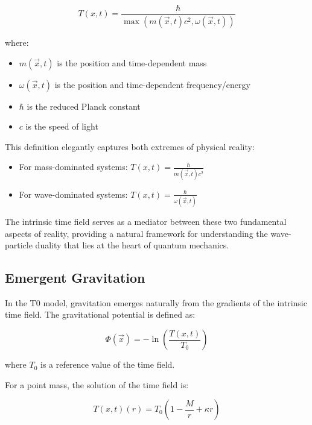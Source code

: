 \documentclass[12pt,a4paper]{article}
\newcommand{\Tfieldt}{T(x,t)}
\newcommand{\Tzero}{T_0}
\newcommand{\vecx}{\vec{x}}
\begin{document}
	\begin{equation}
		\Tfieldt = \frac{\hbar}{\max(m(\vecx,t)c^2, \omega(\vecx,t))}
		\label{eq:time_field}
	\end{equation}
	
	where:
	\begin{itemize}
		\item $m(\vecx,t)$ is the position and time-dependent mass
		\item $\omega(\vecx,t)$ is the position and time-dependent frequency/energy
		\item $\hbar$ is the reduced Planck constant
		\item $c$ is the speed of light
	\end{itemize}
	
	This definition elegantly captures both extremes of physical reality:
	\begin{itemize}
		\item For mass-dominated systems: $\Tfieldt = \frac{\hbar}{m(\vecx,t)c^2}$
		\item For wave-dominated systems: $\Tfieldt = \frac{\hbar}{\omega(\vecx,t)}$
	\end{itemize}
	
	The intrinsic time field serves as a mediator between these two fundamental aspects of reality, providing a natural framework for understanding the wave-particle duality that lies at the heart of quantum mechanics.
	
	\subsection{Emergent Gravitation}
	\label{subsec:emergent_grav}
	
	In the T0 model, gravitation emerges naturally from the gradients of the intrinsic time field. The gravitational potential is defined as:
	
	\begin{equation}
		\Phi(\vecx) = -\ln\left(\frac{\Tfieldt}{\Tzero}\right)
		\label{eq:grav_potential}
	\end{equation}
	
	where $\Tzero$ is a reference value of the time field.
	
	For a point mass, the solution of the time field is:
	
	\begin{equation}
		\Tfieldt(r) = \Tzero\left(1 - \frac{M}{r} + \kappa r\right)
		\label{eq:time_field_solution}
	\end{equation}
	
\end{document}
